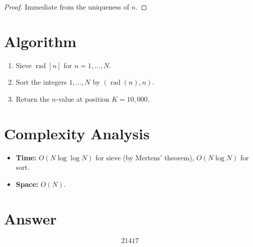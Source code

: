 \documentclass[11pt,a4paper]{article}
\begin{document}
\begin{proof}
Immediate from the uniqueness of $n$.
\end{proof}

\section{Algorithm}

\begin{enumerate}
\item Sieve $\operatorname{rad}[n]$ for $n = 1, \ldots, N$.
\item Sort the integers $1, \ldots, N$ by $(\operatorname{rad}(n), n)$.
\item Return the $n$-value at position $K = 10{,}000$.
\end{enumerate}

\section{Complexity Analysis}

\begin{itemize}
\item \textbf{Time:} $O(N \log \log N)$ for sieve (by Mertens' theorem), $O(N \log N)$ for sort.
\item \textbf{Space:} $O(N)$.
\end{itemize}

\section{Answer}

\[
\boxed{21417}
\]
\end{document}
